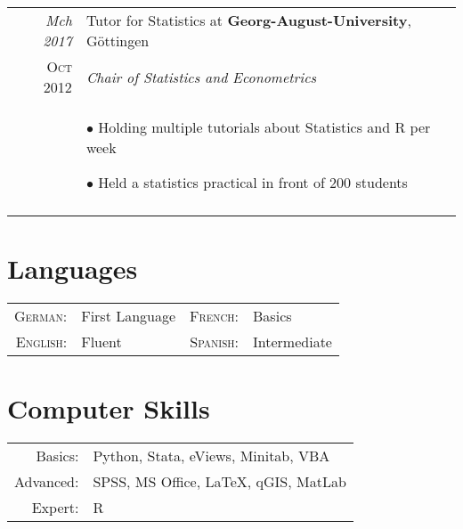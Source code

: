 \documentclass[a4paper,10pt]{article} %
\begin{document}
\begin{longtable}{r|p{10cm}}

\emph{Mch 2017} & Tutor for Statistics at \textbf{Georg-August-University}, Göttingen\\
\textsc{Oct 2012} & \emph{Chair of Statistics and Econometrics}\\
& \footnotesize{
$\bullet$ Holding multiple tutorials about Statistics and R per week

$\bullet$ Held a statistics practical in front of 200 students}\\
\multicolumn{2}{c}{} \\


\end{longtable}



\section{Languages}

\begin{tabular}{rlrl}
\textsc{German:} & First Language & \textsc{French:} & Basics\\
\textsc{English:} & Fluent &\textsc{Spanish:}& Intermediate\\
\end{tabular}

\section{Computer Skills}
\begin{tabular}{rl}
Basics: & Python, Stata, eViews, Minitab, VBA\\

Advanced: & SPSS, MS Office, LaTeX, qGIS, MatLab\\

Expert: & R
\end{tabular}



\end{document}
